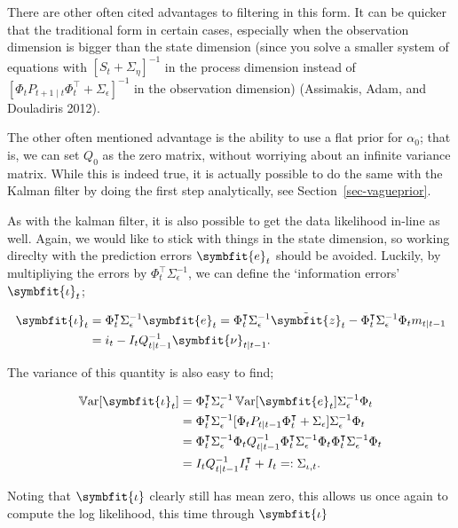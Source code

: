 \documentclass[
]{report}
\DeclareMathOperator{\var}{\mathbb{V}\mathrm{ar}}
\newcommand{\bv}[1]{\symbfit{#1}}
\theoremstyle{plain}
\theoremstyle{plain}
\theoremstyle{plain}
\theoremstyle{remark}
\begin{document}
There are other often cited advantages to filtering in this form. It can
be quicker that the traditional form in certain cases, especially when
the observation dimension is bigger than the state dimension (since you
solve a smaller system of equations with \([S_t + \Sigma_\eta]^{-1}\) in
the process dimension instead of
\([\Phi_t P_{t+1\mid t} \Phi_t^\intercal + \Sigma_\epsilon]^{-1}\) in
the observation dimension) (Assimakis, Adam, and Douladiris 2012).

The other often mentioned advantage is the ability to use a flat prior
for \(\alpha_0\); that is, we can set \(Q_0\) as the zero matrix,
without worriying about an infinite variance matrix. While this is
indeed true, it is actually possible to do the same with the Kalman
filter by doing the first step analytically, see
Section~\ref{sec-vagueprior}.

As with the kalman filter, it is also possible to get the data
likelihood in-line as well. Again, we would like to stick with things in
the state dimension, so working direclty with the prediction errors
\(\bv e_t\) should be avoided. Luckily, by multipliying the errors by
\(\Phi_t^\intercal \Sigma_\epsilon^{-1}\), we can define the
`information errors' \(\bv \iota_t\);

\[\begin{split}
  \bv \iota_t &= \Phi_t^\intercal \Sigma_\epsilon^{-1} \bv e_t = \Phi_t^\intercal \Sigma_\epsilon^{-1} \tilde{\bv z}_t -\Phi_t^\intercal \Sigma_\epsilon^{-1}\Phi_t m_{t\mid t-1}\\
  &= i_t - I_tQ_{t\mid t-1}^{-1}\bv \nu_{t\mid t-1}.
\end{split}
\]

The variance of this quantity is also easy to find;

\[\begin{split}
  \var[\bv \iota_t] &= \Phi_t^\intercal \Sigma_\epsilon^{-1}\var[\bv e_t]\Sigma_\epsilon^{-1}\Phi_t\\
  &= \Phi_t^\intercal \Sigma_\epsilon^{-1} [\Phi_{t} P_{t\mid t-1} \Phi_{t}^\intercal + \Sigma_\epsilon] \Sigma_\epsilon^{-1}\Phi_t\\
  &= \Phi_t^\intercal \Sigma_\epsilon^{-1}\Phi_{t} Q_{t\mid t-1}^{-1} \Phi_{t}^\intercal \Sigma_\epsilon^{-1}\Phi_t \Phi_t^\intercal \Sigma_\epsilon^{-1} \Phi_t\\
  &= I_t Q_{t\mid t-1}^{-1} I_t^\intercal + I_t =: \Sigma_{\iota, t}.
\end{split}
\]

Noting that \(\bv \iota\) clearly still has mean zero, this allows us
once again to compute the log likelihood, this time through \(\bv\iota\)
\end{document}
